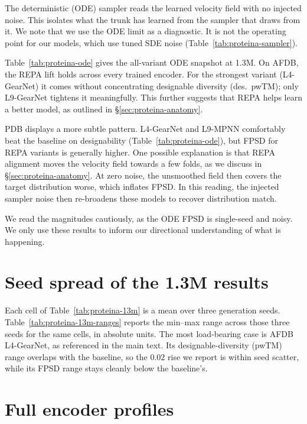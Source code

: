 \documentclass[12pt,a4paper,twoside]{report}
\begin{document}
The deterministic (ODE) sampler reads the learned velocity field with no injected noise. This isolates what the trunk has learned from the sampler that draws from it. We note that we use the ODE limit as a diagnostic. It is not the operating point for our models, which use tuned SDE noise (Table~\ref{tab:proteina-sampler}).

Table~\ref{tab:proteina-ode} gives the all-variant ODE snapshot at 1.3M. On AFDB, the REPA lift holds across every trained encoder. For the strongest variant (L4-GearNet) it comes without concentrating designable diversity (des.\ pwTM); only L9-GearNet tightens it meaningfully. This further suggests that REPA helps learn a better model, as outlined in \S\ref{sec:proteina-anatomy}.

PDB displays a more subtle pattern. L4-GearNet and L9-MPNN comfortably beat the baseline on designability (Table~\ref{tab:proteina-ode}), but FPSD for REPA variants is generally higher. One possible explanation is that REPA alignment moves the velocity field towards a few folds, as we discuss in \S\ref{sec:proteina-anatomy}. At zero noise, the unsmoothed field then covers the target distribution worse, which inflates FPSD. In this reading, the injected sampler noise then re-broadens these models to recover distribution match.

We read the magnitudes cautiously, as the ODE FPSD is single-seed and noisy. We only use these results to inform our directional understanding of what is happening.



\section{Seed spread of the 1.3M results}
\label{app:13m-ranges}

Each cell of Table~\ref{tab:proteina-13m} is a mean over three generation seeds. Table~\ref{tab:proteina-13m-ranges} reports the min--max range across those three seeds for the same cells, in absolute units. The most load-bearing case is AFDB L4-GearNet, as referenced in the main text. Its designable-diversity (pwTM) range overlaps with the baseline, so the $0.02$ rise we report is within seed scatter, while its FPSD range stays cleanly below the baseline's.



\section{Full encoder profiles}
\label{app:profiling-full}
\end{document}
